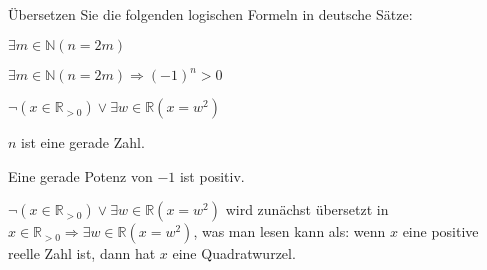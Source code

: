 Übersetzen Sie die folgenden logischen Formeln in deutsche Sätze:
\begin{teilaufgaben}
\item $\exists m\in\mathbb N (n=2m)$
\item $\exists m\in\mathbb N (n=2m)\Rightarrow (-1)^n > 0$
\item $\neg(x\in\mathbb R_{>0})\vee \exists w\in\mathbb R(x=w^2)$
\end{teilaufgaben}


\begin{loesung}
\begin{teilaufgaben}
\item $n$ ist eine gerade Zahl.
\item Eine gerade Potenz von $-1$ ist positiv.
\item $\neg (x\in\mathbb R_{>0})\vee \exists w\in\mathbb R(x=w^2)$ wird zunächst
übersetzt in
$x\in\mathbb R_{>0}\Rightarrow \exists w\in\mathbb R(x=w^2)$, was man lesen
kann als: wenn $x$ eine positive reelle Zahl ist, dann hat $x$ eine
Quadratwurzel.
\qedhere
\end{teilaufgaben}
\end{loesung}

